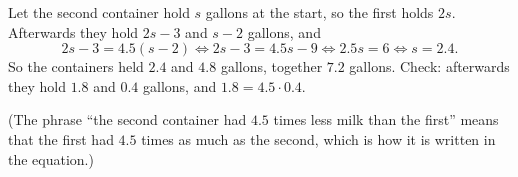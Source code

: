 Let the second container hold $s$ gallons at the start, so the first holds $2s$. Afterwards they hold $2s-3$ and $s-2$ gallons, and
\[
2s-3=4.5(s-2)\iff 2s-3=4.5s-9\iff 2.5s=6\iff s=2.4 .
\]
So the containers held $2.4$ and $4.8$ gallons, together $\boxed{7.2}$ gallons. Check: afterwards they hold $1.8$ and $0.4$ gallons, and $1.8=4.5\cdot0.4$.

(The phrase ``the second container had $4.5$ times less milk than the first'' means that the first had $4.5$ times as much as the second, which is how it is written in the equation.)
